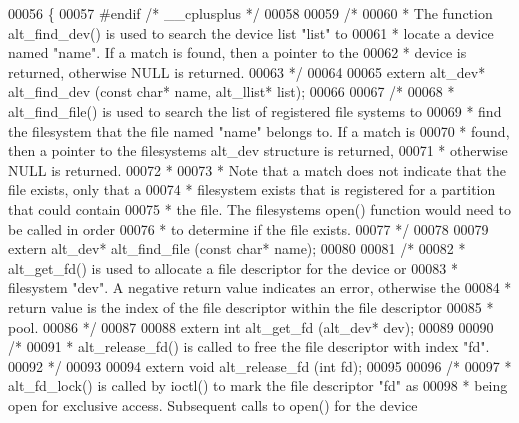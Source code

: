 \begin{DoxyCode}
00056 \{
00057 \textcolor{preprocessor}{#endif }\textcolor{comment}{/* \_\_cplusplus */}\textcolor{preprocessor}{}
00058 
00059 \textcolor{comment}{/*}
00060 \textcolor{comment}{ * The function alt\_find\_dev() is used to search the device list "list" to}
00061 \textcolor{comment}{ * locate a device named "name". If a match is found, then a pointer to the}
00062 \textcolor{comment}{ * device is returned, otherwise NULL is returned. }
00063 \textcolor{comment}{ */}
00064  
00065 \textcolor{keyword}{extern} alt_dev* alt_find_dev (\textcolor{keyword}{const} \textcolor{keywordtype}{char}* name, alt_llist* list);
00066 
00067 \textcolor{comment}{/*}
00068 \textcolor{comment}{ * alt\_find\_file() is used to search the list of registered file systems to}
00069 \textcolor{comment}{ * find the filesystem that the file named "name" belongs to. If a match is}
00070 \textcolor{comment}{ * found, then a pointer to the filesystems alt\_dev structure is returned,}
00071 \textcolor{comment}{ * otherwise NULL is returned.}
00072 \textcolor{comment}{ *}
00073 \textcolor{comment}{ * Note that a match does not indicate that the file exists, only that a }
00074 \textcolor{comment}{ * filesystem exists that is registered for a partition that could contain}
00075 \textcolor{comment}{ * the file. The filesystems open() function would need to be called in order}
00076 \textcolor{comment}{ * to determine if the file exists.}
00077 \textcolor{comment}{ */}
00078 
00079 \textcolor{keyword}{extern} alt_dev* alt_find_file (\textcolor{keyword}{const} \textcolor{keywordtype}{char}* name);
00080 
00081 \textcolor{comment}{/*}
00082 \textcolor{comment}{ * alt\_get\_fd() is used to allocate a file descriptor for the device or }
00083 \textcolor{comment}{ * filesystem "dev". A negative return value indicates an error, otherwise the}
00084 \textcolor{comment}{ * return value is the index of the file descriptor within the file descriptor}
00085 \textcolor{comment}{ * pool.}
00086 \textcolor{comment}{ */}
00087 
00088 \textcolor{keyword}{extern} \textcolor{keywordtype}{int} alt_get_fd (alt_dev* dev);
00089 
00090 \textcolor{comment}{/*}
00091 \textcolor{comment}{ * alt\_release\_fd() is called to free the file descriptor with index "fd".}
00092 \textcolor{comment}{ */}
00093 
00094 \textcolor{keyword}{extern} \textcolor{keywordtype}{void} alt_release_fd (\textcolor{keywordtype}{int} fd);
00095 
00096 \textcolor{comment}{/*}
00097 \textcolor{comment}{ * alt\_fd\_lock() is called by ioctl() to mark the file descriptor "fd" as }
00098 \textcolor{comment}{ * being open for exclusive access. Subsequent calls to open() for the device }

\end{DoxyCode}
